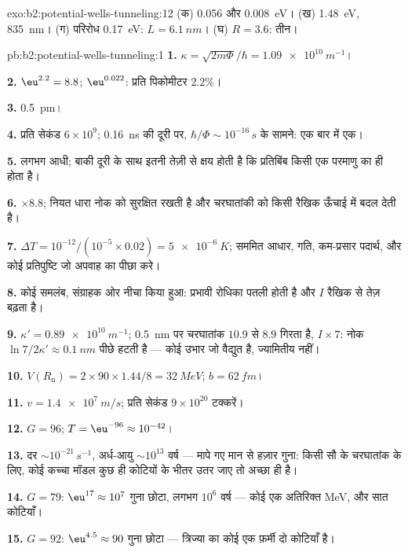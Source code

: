 \begin{solution}{exo:b2:potential-wells-tunneling:12}
(क) \qty{0.056}{} और \qty{0.008}{eV}। (ख) \qty{1.48}{eV}, \qty{835}{nm}। (ग) परिरोध
\qty{0.17}{eV}: $L = \qty{6.1}{nm}$। (घ) $R = 3.6$: तीन।
\end{solution}

\begin{solution}{pb:b2:potential-wells-tunneling:1}
\textbf{1.} $\kappa = \sqrt{2m\Phi}/\hbar = \qty{1.09e10}{m^{-1}}$।

\textbf{2.} $\eu^{2.2} = 8.8$; $\eu^{0.022}$: प्रति पिकोमीटर $2.2\%$।

\textbf{3.} \qty{0.5}{pm}।

\textbf{4.} प्रति सेकंड $6 \times 10^9$; \qty{0.16}{ns} की दूरी पर, $\hbar/\Phi
\sim 10^{-16}\,\unit{s}$ के सामने: एक बार में एक।

\textbf{5.} लगभग आधी; बाकी दूरी के साथ इतनी तेज़ी से क्षय होती है कि
प्रतिबिंब किसी एक परमाणु का ही होता है।

\textbf{6.} $\times 8.8$; नियत धारा नोक को सुरक्षित रखती है और
चरघातांकी को किसी रैखिक ऊँचाई में बदल देती है।

\textbf{7.} $\Delta T = 10^{-12}/(10^{-5} \times 0.02) = \qty{5e-6}{K}$; सममित
आधार, गति, कम-प्रसार पदार्थ, और कोई प्रतिपुष्टि जो
अपवाह का पीछा करे।

\textbf{8.} कोई समलंब, संग्राहक ओर नीचा किया हुआ: प्रभावी
रोधिका पतली होती है और $I$ रैखिक से तेज़ बढ़ता है।

\textbf{9.} $\kappa' = \qty{0.89e10}{m^{-1}}$; \qty{0.5}{nm} पर चरघातांक
$10.9$ से $8.9$ गिरता है, $I \times 7$: नोक $\ln 7/2\kappa' \approx \qty{0.1}{nm}$ पीछे हटती है
--- कोई उभार जो वैद्युत है, ज्यामितीय नहीं।

\textbf{10.} $V(R_{\text{n}}) = 2 \times 90 \times 1.44/8 = \qty{32}{MeV}$; $b = \qty{62}{fm}$।

\textbf{11.} $v = \qty{1.4e7}{m/s}$; प्रति सेकंड $9 \times 10^{20}$ टक्करें।

\textbf{12.} $G = 96$; $T = \eu^{-96} \approx 10^{-42}$।

\textbf{13.} दर $\sim 10^{-21}\,\unit{s^{-1}}$, अर्ध-आयु $\sim 10^{13}$ वर्ष --- मापे गए
मान से हज़ार गुना: किसी सौ के चरघातांक के लिए, कोई
कच्चा मॉडल कुछ ही कोटियों के भीतर उतर जाए तो अच्छा ही है।

\textbf{14.} $G = 79$: $\eu^{17} \approx 10^7$ गुना छोटा, लगभग $10^6$ वर्ष ---
कोई एक अतिरिक्त \unit{MeV}, और सात कोटियाँ।

\textbf{15.} $G = 92$: $\eu^{4.5} \approx 90$ गुना छोटा --- त्रिज्या का कोई एक फ़र्मी
दो कोटियाँ है।


\end{solution}
